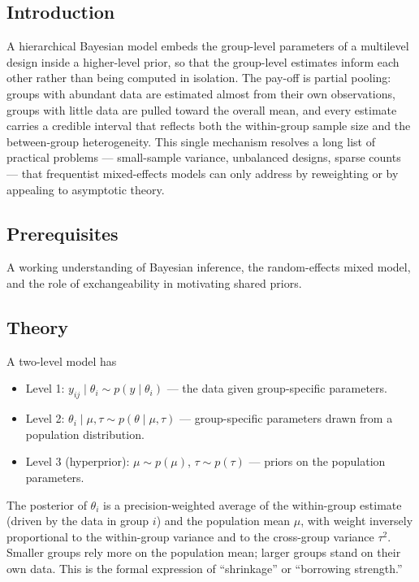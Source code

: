 \documentclass[
]{article}
\author{}
\date{\vspace{-2.5em}}
\providecommand{\tightlist}{%
  \setlength{\itemsep}{0pt}\setlength{\parskip}{0pt}}
\begin{document}
\subsection{Introduction}\label{introduction}

A hierarchical Bayesian model embeds the group-level parameters of a
multilevel design inside a higher-level prior, so that the group-level
estimates inform each other rather than being computed in isolation. The
pay-off is partial pooling: groups with abundant data are estimated
almost from their own observations, groups with little data are pulled
toward the overall mean, and every estimate carries a credible interval
that reflects both the within-group sample size and the between-group
heterogeneity. This single mechanism resolves a long list of practical
problems --- small-sample variance, unbalanced designs, sparse counts
--- that frequentist mixed-effects models can only address by
reweighting or by appealing to asymptotic theory.

\subsection{Prerequisites}\label{prerequisites}

A working understanding of Bayesian inference, the random-effects mixed
model, and the role of exchangeability in motivating shared priors.

\subsection{Theory}\label{theory}

A two-level model has

\begin{itemize}
\tightlist
\item
  Level 1: \(y_{ij} \mid \theta_i \sim p(y \mid \theta_i)\) --- the data
  given group-specific parameters.
\item
  Level 2: \(\theta_i \mid \mu, \tau \sim p(\theta \mid \mu, \tau)\) ---
  group-specific parameters drawn from a population distribution.
\item
  Level 3 (hyperprior): \(\mu \sim p(\mu)\), \(\tau \sim p(\tau)\) ---
  priors on the population parameters.
\end{itemize}

The posterior of \(\theta_i\) is a precision-weighted average of the
within-group estimate (driven by the data in group \(i\)) and the
population mean \(\mu\), with weight inversely proportional to the
within-group variance and to the cross-group variance \(\tau^2\).
Smaller groups rely more on the population mean; larger groups stand on
their own data. This is the formal expression of ``shrinkage'' or
``borrowing strength.''
\end{document}
